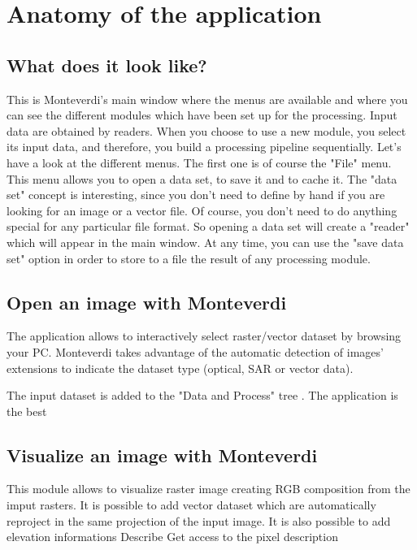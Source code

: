\documentclass{InsightSoftwareGuide}
\begin{document}
 
\chapter{Anatomy of the application}
\section{What does it look like?}
This is Monteverdi's main window where the menus are available and where you can see the different modules which have been 
set up for the processing. Input data are obtained by readers. When you choose to use a new module, you select its input data,
 and therefore, you build a processing pipeline sequentially. Let's have a look at the different menus. The first one is of
 course the "File" menu. This menu allows you to open a data set, to save it and to cache it. The "data set" concept is
 interesting, since you don't need to define by hand if you are looking for an image or a vector file. Of course, 
you don't need to do anything special for any particular file format. So opening a data set will create a "reader" 
which will appear in the main window. At any time, you can use the "save data set" option in order to store to a 
file the result of any processing module.
\section{Open an image with Monteverdi}
The application allows to interactively select raster/vector dataset by browsing your PC. Monteverdi takes
advantage of the automatic detection of images' extensions to indicate the dataset type (optical, SAR or vector data).   

The input dataset is added to the "Data and Process" tree . The application is the best

\section{Visualize an image with Monteverdi}
This module allows to visualize raster image creating RGB composition from the imput rasters. It is possible to add 
vector dataset which are automatically reproject in the same projection of the input image. 
It is also possible to add elevation informations 
Describe Get access to the pixel description
\end{document}
